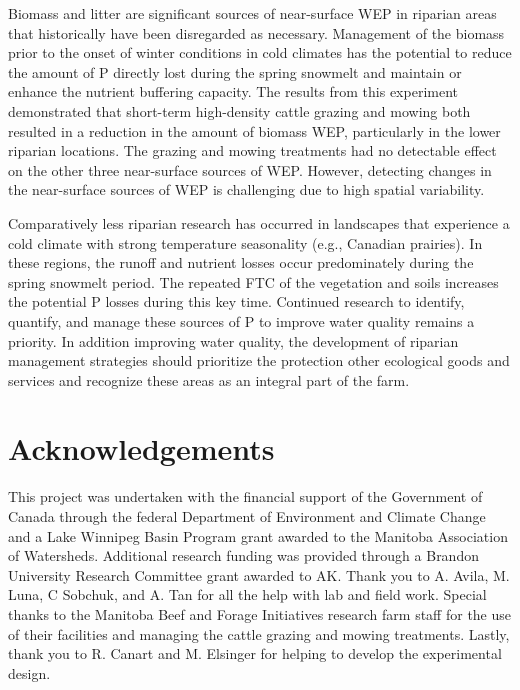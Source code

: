 \documentclass[
]{agujournal2019}
\begin{document}
Biomass and litter are significant sources of near-surface WEP in
riparian areas that historically have been disregarded as necessary.
Management of the biomass prior to the onset of winter conditions in
cold climates has the potential to reduce the amount of P directly lost
during the spring snowmelt and maintain or enhance the nutrient
buffering capacity. The results from this experiment demonstrated that
short-term high-density cattle grazing and mowing both resulted in a
reduction in the amount of biomass WEP, particularly in the lower
riparian locations. The grazing and mowing treatments had no detectable
effect on the other three near-surface sources of WEP. However,
detecting changes in the near-surface sources of WEP is challenging due
to high spatial variability.

Comparatively less riparian research has occurred in landscapes that
experience a cold climate with strong temperature seasonality (e.g.,
Canadian prairies). In these regions, the runoff and nutrient losses
occur predominately during the spring snowmelt period. The repeated FTC
of the vegetation and soils increases the potential P losses during this
key time. Continued research to identify, quantify, and manage these
sources of P to improve water quality remains a priority. In addition
improving water quality, the development of riparian management
strategies should prioritize the protection other ecological goods and
services and recognize these areas as an integral part of the farm.

\section*{Acknowledgements}\label{acknowledgements}

This project was undertaken with the financial support of the Government
of Canada through the federal Department of Environment and Climate
Change and a Lake Winnipeg Basin Program grant awarded to the Manitoba
Association of Watersheds. Additional research funding was provided
through a Brandon University Research Committee grant awarded to AK.
Thank you to A. Avila, M. Luna, C Sobchuk, and A. Tan for all the help
with lab and field work. Special thanks to the Manitoba Beef and Forage
Initiatives research farm staff for the use of their facilities and
managing the cattle grazing and mowing treatments. Lastly, thank you to
R. Canart and M. Elsinger for helping to develop the experimental
design.
\end{document}
